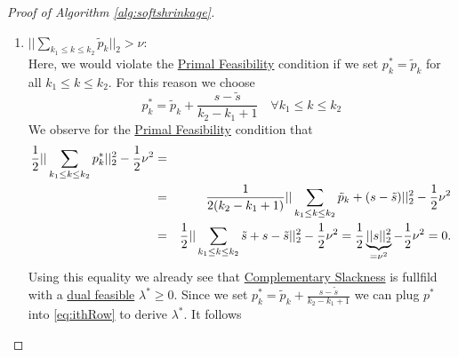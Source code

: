 \begin{proof}[Proof of Algorithm \ref{alg:softshrinkage}]
\begin{enumerate}
            \item $||\sum\limits_{k_{1} \le k \le k_{2}} \tilde{p}_{k}||_{2} > \nu$:\\
            Here, we would violate the \underline{Primal Feasibility} condition if we set $p^{\ast}_{k} = \tilde{p}_{k}$ for all $k_{1} \le k \le k_{2}$. For this reason we choose
                $$p^{\ast}_{k} = \tilde{p}_{k} + \frac{s - \tilde{s}}{k_{2} - k_{1} + 1} \,\,\,\,\,\, \forall k_{1} \le k \le k_{2}$$
            We observe for the \underline{Primal Feasibility} condition that
                \begin{eqnarray}
                    \frac{1}{2} ||\sum_{k_{1} \le k \le k_{2}} p^{\ast}_{k}||_{2}^{2} - \frac{1}{2} \nu^{2} &=& \label{eq:caseTwo} \\
                    &=& \frac{1}{2(k_{2} - k_{1} + 1)} ||\sum_{k_{1} \le k \le k_{2}} \tilde{p}_{k} + (s - \tilde{s})||_{2}^{2} - \frac{1}{2} \nu^{2}\notag \\
                    &=& \frac{1}{2} ||\sum_{k_{1} \le k \le k_{2}} \tilde{s} + s - \tilde{s}||_{2}^{2} - \frac{1}{2} \nu^{2} = \frac{1}{2} \underbrace{||s||_{2}^{2}}_{= \nu^{2}} - \frac{1}{2} \nu^{2} = 0. \notag
                \end{eqnarray}
            Using this equality we already see that \underline{Complementary Slackness} is fullfild with a \underline{dual feasible} $\lambda^{\ast} \ge 0$. Since we set $p^{\ast}_{k} = \tilde{p}_{k} + \frac{s - \tilde{s}}{k_{2} - k_{1} + 1}$ we can plug $p^{\ast}$ into \ref{eq:ithRow} to derive $\lambda^{\ast}$. It follows %


\end{enumerate}
\end{proof}
